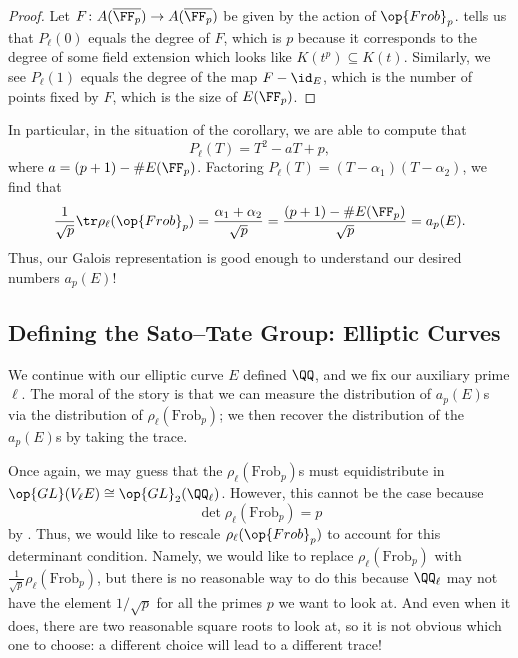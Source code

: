 \documentclass{article}
\begin{document}
\begin{proof}
	Let $F\colon A(\overline{\FF_p})\to A(\overline{\FF_p})$ be given by the action of $\op{Frob}_p$.  tells us that $P_\ell(0)$ equals the degree of $F$, which is $p$ because it corresponds to the degree of some field extension which looks like $K(t^p)\subseteq K(t)$. Similarly, we see $P_\ell(1)$ equals the degree of the map $F-\id_E$, which is the number of points fixed by $F$, which is the size of $E(\FF_p)$.
\end{proof}
In particular, in the situation of the corollary, we are able to compute that
\[P_\ell(T)=T^2-aT+p,\]
where $a=(p+1)-\#E(\FF_p)$. Factoring $P_\ell(T)=(T-\alpha_{1})(T-\alpha_2)$, we find that
\[\frac1{\sqrt p}\tr\rho_\ell({\op{Frob}_p})=\frac{\alpha_1+\alpha_2}{\sqrt p}=\frac{(p+1)-\#E(\FF_p)}{\sqrt p}=a_p(E).\]
Thus, our Galois representation is good enough to understand our desired numbers $a_p(E)$!

\subsection{Defining the Sato--Tate Group: Elliptic Curves}
We continue with our elliptic curve $E$ defined $\QQ$, and we fix our auxiliary prime $\ell$. The moral of the story is that we can measure the distribution of $a_p(E)$s via the distribution of $\rho_\ell(\mathrm{Frob}_p)$; we then recover the distribution of the $a_p(E)$s by taking the trace.

Once again, we may guess that the $\rho_\ell({\mathrm{Frob}_p})$s must equidistribute in $\op{GL}(V_\ell E)\cong\op{GL}_2(\QQ_\ell)$. However, this cannot be the case because
\[\det\rho_\ell({\mathrm{Frob}_p})=p\]
by . Thus, we would like to rescale $\rho_\ell({\op{Frob}_p})$ to account for this determinant condition. Namely, we would like to replace $\rho_\ell({\mathrm{Frob}_p})$ with $\frac1{\sqrt p}\rho_\ell({\mathrm{Frob}_p})$, but there is no reasonable way to do this because $\QQ_\ell$ may not have the element $1/\sqrt p$ for all the primes $p$ we want to look at. And even when it does, there are two reasonable square roots to look at, so it is not obvious which one to choose: a different choice will lead to a different trace!
\end{document}
